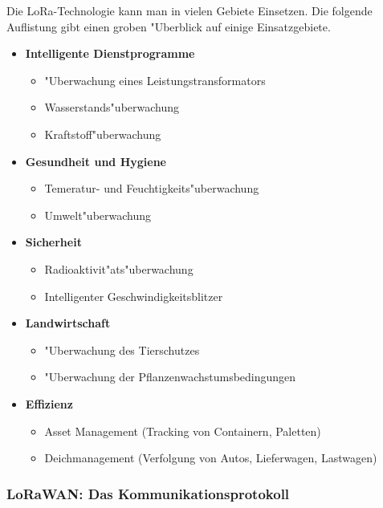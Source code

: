 Die LoRa-Technologie kann man in vielen Gebiete Einsetzen. Die folgende 
Auflistung gibt einen groben "Uberblick auf einige Einsatzgebiete.

\begin{itemize}
	\item \textbf{Intelligente Dienstprogramme}
	\begin{itemize}
		\item "Uberwachung eines Leistungstransformators
		\item Wasserstands"uberwachung
		\item Kraftstoff"uberwachung
	\end{itemize}

	\item \textbf{Gesundheit und Hygiene}
	\begin{itemize}
		\item Temeratur- und Feuchtigkeits"uberwachung
		\item Umwelt"uberwachung
	\end{itemize}

	\item \textbf{Sicherheit}
	\begin{itemize}
		\item Radioaktivit"ats"uberwachung
		\item Intelligenter Geschwindigkeitsblitzer
	\end{itemize}

	\item \textbf{Landwirtschaft}
	\begin{itemize}
		\item "Uberwachung des Tierschutzes
		\item "Uberwachung der Pflanzenwachstumsbedingungen
	\end{itemize}

		\vspace{3cm}
		\item \textbf{Effizienz}
	\begin{itemize}
		\item Asset Management (Tracking von Containern, Paletten)
		\item Deichmanagement (Verfolgung von Autos, Lieferwagen, 
		Lastwagen)
	\end{itemize}
\end{itemize}

\subsubsection{LoRaWAN: Das Kommunikationsprotokoll}\label{protokol}


